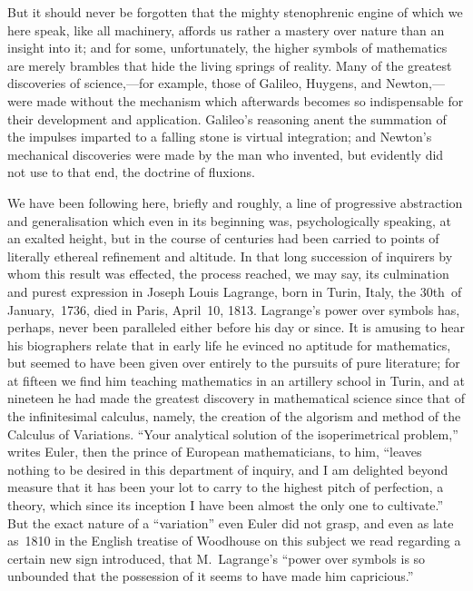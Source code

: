 \documentclass[12pt]{book}[2005/09/16]
\newcommand{\PageSep}[1]{\ignorespaces}
\newcommand{\stars}{%
\begin{center}
  \makebox[1in][c]{
    \raisebox{-0.5ex}{*}\hfill\raisebox{0.5ex}{*}\hfill\raisebox{-0.5ex}{*}%
  }
\end{center}
}
\begin{document}
But it should never be forgotten that the mighty stenophrenic
engine of which we here speak, like all machinery, affords us rather
a mastery over nature than an insight into it; and for some, unfortunately,
the higher symbols of mathematics are merely brambles
that hide the living springs of reality. Many of the greatest
discoveries of science,---for example, those of Galileo, Huygens,
%
%
and Newton,---were made without the mechanism which afterwards
becomes so indispensable for their development and application.
Galileo's reasoning anent the summation of the impulses imparted
to a falling stone is virtual integration; and Newton's mechanical
discoveries were made by the man who invented, but evidently did
not use to that end, the doctrine of fluxions.
\stars

We have been following here, briefly and roughly, a line of
progressive abstraction and generalisation which even in its beginning
was, psychologically speaking, at an exalted height, but in the
course of centuries had been carried to points of literally ethereal
refinement and altitude. In that long succession of inquirers by
whom this result was effected, the process reached, we may say,
its culmination and purest expression in Joseph Louis Lagrange,
born in Turin, Italy, the 30th~of January,~1736, died in Paris, April~10,
1813. Lagrange's power over symbols has, perhaps, never been
paralleled either before his day or since. It is amusing to hear his
biographers relate that in early life he evinced no aptitude for
mathematics, but seemed to have been given over entirely to the
pursuits of pure literature; for at fifteen we find him teaching
mathematics in an artillery school in Turin, and at nineteen he
had made the greatest discovery in mathematical science since that
of the infinitesimal calculus, namely, the creation of the algorism
\PageSep{x}
%
and method of the Calculus of Variations. ``Your analytical solution
of the isoperimetrical problem,'' writes Euler, then the prince
%
of European mathematicians, to him, ``leaves nothing to be desired
in this department of inquiry, and I am delighted beyond measure
that it has been your lot to carry to the highest pitch of perfection,
a theory, which since its inception I have been almost the only one
to cultivate.'' But the exact nature of a ``variation'' even Euler
did not grasp, and even as late as~1810 in the English treatise of
Woodhouse on this subject we read regarding a certain new sign
%
introduced, that M.~Lagrange's ``power over symbols is so unbounded
that the possession of it seems to have made him capricious.''
\end{document}
